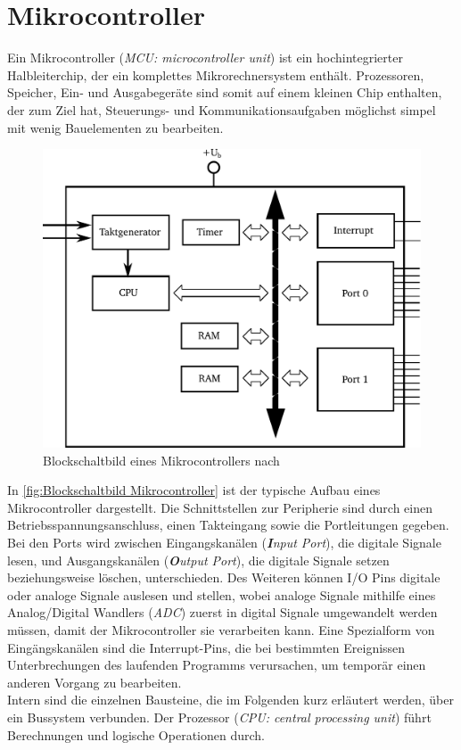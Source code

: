 \section{Mikrocontroller}
Ein Mikrocontroller (\textit{MCU: microcontroller unit}) ist ein hochintegrierter Halbleiterchip, der ein komplettes Mikrorechnersystem enthält. Prozessoren, Speicher, Ein- und Ausgabegeräte sind somit auf einem kleinen Chip enthalten, der zum Ziel hat, Steuerungs- und Kommunikationsaufgaben möglichst simpel mit wenig Bauelementen zu bearbeiten. \\
\begin{figure}[H]
	\centering
		\includegraphics[width=0.55\columnwidth]{Bilder/BlockschaltbildMikrocontroller2.pdf}
	\caption{Blockschaltbild eines Mikrocontrollers nach \cite[S.3]{Bernstein2015}}
	\label{fig:Blockschaltbild Mikrocontroller}
\end{figure} 
\noindent
In \autoref{fig:Blockschaltbild Mikrocontroller} ist der typische Aufbau eines Mikrocontroller dargestellt. Die Schnittstellen zur Peripherie sind durch einen Betriebsspannungsanschluss, einen Takteingang sowie die Portleitungen  gegeben. Bei den Ports wird zwischen Eingangskanälen (\textit{\textbf{I}nput Port}), die digitale Signale lesen, und Ausgangskanälen (\textit{\textbf{O}utput Port}), die digitale Signale setzen beziehungsweise löschen, unterschieden. Des Weiteren können I/O Pins digitale oder analoge Signale auslesen und stellen, wobei analoge Signale mithilfe eines Analog/Digital Wandlers (\textit{ADC}) zuerst in digital Signale umgewandelt werden müssen, damit der Mikrocontroller sie verarbeiten kann.
Eine Spezialform von Eingängskanälen sind die Interrupt-Pins, die bei bestimmten Ereignissen Unterbrechungen des laufenden Programms verursachen, um temporär einen anderen Vorgang zu bearbeiten. \\
Intern sind die einzelnen Bausteine, die im Folgenden kurz erläutert werden, über ein Bussystem verbunden.
Der Prozessor (\textit{CPU: central processing unit}) führt Berechnungen und logische Operationen durch.
